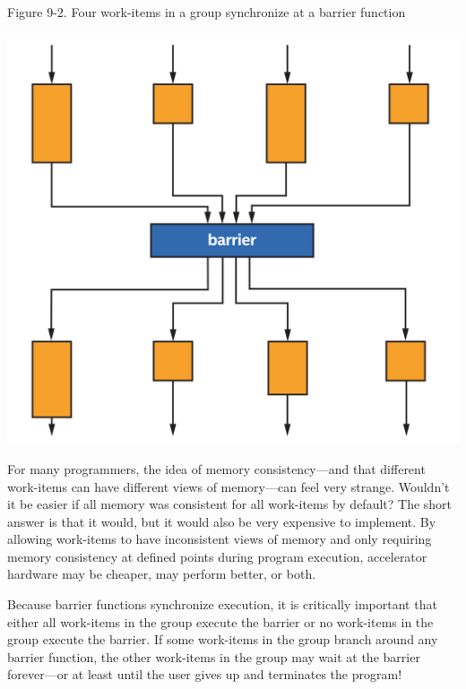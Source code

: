 \hspace*{\fill} \par %
Figure 9-2. Four work-items in a group synchronize at a barrier function
\begin{center}
	\includegraphics[width=1.\textwidth]{content/chapter-9/images/3}
\end{center}

\begin{tcolorbox}[colback=blue!5!white,colframe=blue!75!black, title=WHY ISN’T MEMORY CONSISTENT BY DEFAULT?]
For many programmers, the idea of memory consistency—and that different work-items can have different views of memory—can feel very strange. Wouldn’t it be easier if all memory was consistent for all work-items by default? The short answer is that it would, but it would also be very expensive to implement. By allowing work-items to have inconsistent views of memory and only requiring memory consistency at defined points during program execution, accelerator hardware may be cheaper, may perform better, or both.
\end{tcolorbox}

Because barrier functions synchronize execution, it is critically important that either all work-items in the group execute the barrier or no work-items in the group execute the barrier. If some work-items in the group branch around any barrier function, the other work-items in the group may wait at the barrier forever—or at least until the user gives up and terminates the program!\par

